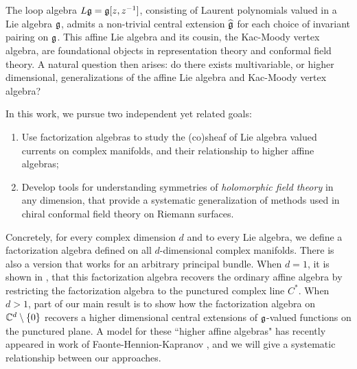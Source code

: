 \section*{}


The loop algebra $L\mathfrak g = \mathfrak g[z,z^{-1}]$, consisting of Laurent polynomials valued in a Lie algebra $\mathfrak g$,
admits a non-trivial central extension $\widehat{\mathfrak g}$ for each choice of invariant pairing on $\mathfrak g$.
This affine Lie algebra and its cousin, the Kac-Moody vertex algebra, are foundational objects in representation theory and conformal field theory. 
A natural question then arises: do there exists multivariable, or higher dimensional, generalizations of the affine Lie algebra and Kac-Moody vertex algebra? 

In this work, we pursue two independent yet related goals:
 
\begin{enumerate}
\item Use factorization algebras to study the (co)sheaf of Lie algebra valued currents on complex manifolds, and their relationship to higher affine algebras;
\item Develop tools for understanding symmetries of {\em holomorphic field theory} in any dimension, that provide a systematic generalization of methods used in chiral conformal field theory on Riemann surfaces.
\end{enumerate}

Concretely, for every complex dimension $d$ and to every Lie algebra, we define a factorization algebra defined on all $d$-dimensional complex manifolds. 
There is also a version that works for an arbitrary principal bundle. 
When $d=1$, it is shown in \cite{CG1}, that this factorization algebra recovers the ordinary affine algebra by restricting the factorization algebra to the punctured complex line $C^*$. 
When $d > 1$, part of our main result is to show how the factorization algebra on $\mathbb C^d \setminus \{0\}$ recovers a higher dimensional central extensions of $\mathfrak g$-valued functions on the punctured plane. 
A model for these ``higher affine algebras" has recently appeared in work of Faonte-Hennion-Kapranov \cite{FHK}, and we will give a systematic relationship between our approaches. 

